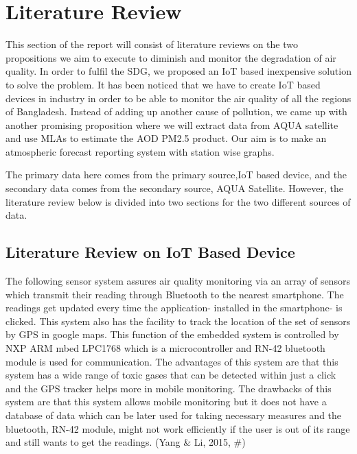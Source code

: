 \chapter{Literature Review}
This section of the report will consist of literature reviews on the two propositions we aim to execute to diminish and monitor the degradation of air quality. In order to fulfil the SDG, we proposed an IoT based inexpensive solution to solve the problem. It has been noticed that we have to create IoT based devices in industry in order to be able to monitor the air quality of all the regions of Bangladesh. Instead of adding up another cause of pollution, we came up with another promising proposition where we will extract data from AQUA satellite and use MLAs to estimate the AOD PM2.5 product. Our aim is to make an atmospheric forecast reporting system with station wise graphs. 

The primary data here comes from the primary source,IoT based device, and the secondary data comes from the secondary source, AQUA Satellite. However, the literature review below is divided into two sections for the two different sources of data.

\section{Literature Review on IoT Based Device}

The following sensor system assures air quality monitoring via an array of sensors which transmit their reading through Bluetooth to the nearest smartphone. The readings get updated every time the application- installed in the smartphone- is clicked. This system also has the facility to track the location of the set of sensors by GPS in google maps. This function of the embedded system is controlled by NXP ARM mbed LPC1768 which is a microcontroller and RN-42 bluetooth module is used for communication. The advantages of this system are that this system has a wide range of toxic gases that can be detected within just a click and the GPS tracker helps more in mobile monitoring. The drawbacks of this system are that this system allows mobile monitoring but it does not have a database of data which can be later used for taking necessary measures and the bluetooth, RN-42 module, might not work efficiently if the user is out of its range and still wants to get the readings. (Yang & Li, 2015, #)

